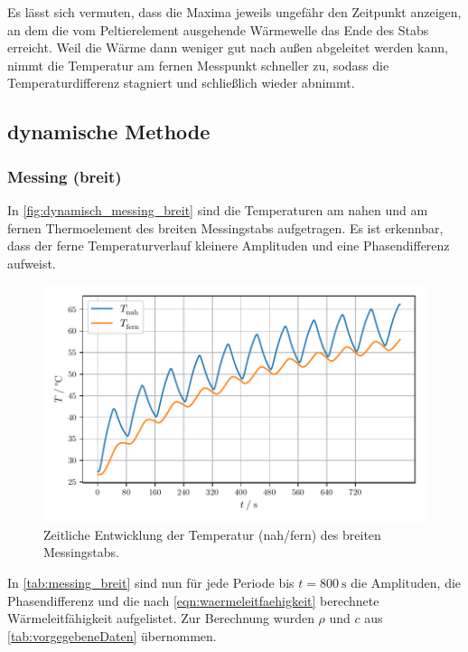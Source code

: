 Es lässt sich vermuten, dass die Maxima jeweils ungefähr den Zeitpunkt anzeigen,
an dem die vom Peltierelement ausgehende Wärmewelle das Ende des Stabs erreicht.
Weil die Wärme dann weniger gut nach außen abgeleitet werden kann,
nimmt die Temperatur am fernen Messpunkt schneller zu,
sodass die Temperaturdifferenz stagniert und schließlich wieder abnimmt.


\subsection{dynamische Methode}
\label{sec:auswertung_dynamisch}

\subsubsection{Messing (breit)}

In \autoref{fig:dynamisch_messing_breit} sind die Temperaturen am nahen und am fernen Thermoelement des breiten Messingstabs aufgetragen.
Es ist erkennbar, dass der ferne Temperaturverlauf kleinere Amplituden und eine Phasendifferenz aufweist.

\begin{figure}[H]
  \centering
  \includegraphics{build/plot_dynamisch_messing_breit.pdf}
  \caption{Zeitliche Entwicklung der Temperatur (nah/fern) des breiten Messingstabs.}
  \label{fig:dynamisch_messing_breit}
\end{figure}

In \autoref{tab:messing_breit} sind nun für jede Periode bis $t = \SI{800}{\second}$ die Amplituden, die Phasendifferenz und die nach \autoref{eqn:waermeleitfaehigkeit} berechnete Wärmeleitfähigkeit aufgelistet.
Zur Berechnung wurden $\rho$ und $c$ aus \autoref{tab:vorgegebeneDaten} übernommen.

